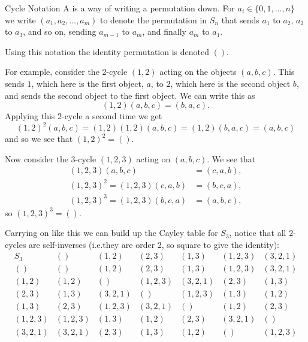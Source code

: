\documentclass[fleqn]{NotesClass}
\begin{document}
    \begin{ntn}{Cycle Notation}{}
        A  is a way of writing a permutation down.
        For \(a_i \in \{0, 1, \dotsc, n\}\) we write \((a_1, a_2, \dotsc, a_m)\) to denote the permutation in \(S_n\) that sends \(a_1\) to \(a_2\), \(a_2\) to \(a_3\), and so on, sending \(a_{m-1}\) to \(a_m\), and finally \(a_m\) to \(a_1\).
        
        Using this notation the identity permutation is denoted \(()\).
    \end{ntn}
    
    For example, consider the 2-cycle \((1, 2)\) acting on the objects \((a, b, c)\).
    This sends \(1\), which here is the first object, \(a\), to \(2\), which here is the second object \(b\), and sends the second object to the first object.
    We can write this as
    \begin{equation}
        (1, 2)(a, b, c) = (b, a, c).
    \end{equation}
    Applying this 2-cycle a second time we get
    \begin{equation}
        (1, 2)^2(a, b, c) = (1, 2)(1, 2)(a, b, c) = (1, 2)(b, a, c) = (a, b, c)
    \end{equation}
    and so we see that \((1, 2)^2 = ()\).
    
    Now consider the 3-cycle \((1, 2, 3)\) acting on \((a, b, c)\).
    We see that
    \begin{align}
        (1, 2, 3)(a, b, c) &= (c, a, b),\\
        (1, 2, 3)^2 = (1, 2, 3)(c, a, b) &= (b, c, a),\\
        (1, 2, 3)^3 = (1, 2, 3)(b, c, a) &= (a, b, c),
    \end{align}
    so \((1, 2, 3)^3 = ()\).
    
    Carrying on like this we can build up the Cayley table for \(S_3\), notice that all 2-cycles are self-inverses (i.e.\@ they are order 2, so square to give the identity):
    \begin{equation}
        \begin{array}{c|cccccc}
            S_3       & ()        & (1, 2)    & (2, 3)    & (1, 3)    & (1, 2, 3) & (3, 2, 1) \\ \hline
            ()        & ()        & (1, 2)    & (2, 3)    & (1, 3)    & (1, 2, 3) & (3, 2, 1) \\
            (1, 2)    & (1, 2)    & ()        & (1, 2 ,3) & (3, 2, 1) & (2, 3)    & (1, 3)    \\
            (2, 3)    & (1, 3)    & (3, 2, 1) & ()        & (1, 2, 3) & (1, 3)    & (1, 2)    \\
            (1, 3)    & (2, 3)    & (1, 2, 3) & (3, 2, 1) & ()        & (1, 2)    & (2, 3)    \\
            (1, 2, 3) & (1, 2, 3) & (1, 3)    & (1, 2)    & (2, 3)    & (3, 2, 1) & ()        \\
            (3, 2, 1) & (3, 2, 1) & (2, 3)    & (1, 3)    & (1, 2)    & ()        & (1, 2, 3) \\
        \end{array}
    \end{equation}
    
\end{document}
